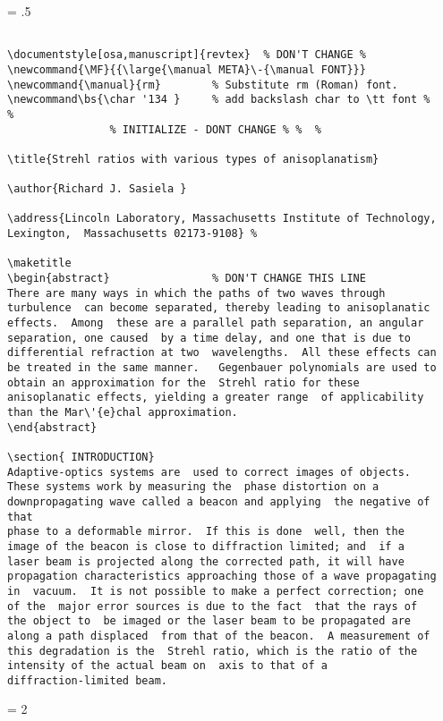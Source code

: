 \newpage
\baselineskip = .5\baselineskip  %
\begin{verbatim}

\documentstyle[osa,manuscript]{revtex}  % DON'T CHANGE %
\newcommand{\MF}{{\large{\manual META}\-{\manual FONT}}}
\newcommand{\manual}{rm}        % Substitute rm (Roman) font.
\newcommand\bs{\char '134 }     % add backslash char to \tt font %
%
                % INITIALIZE - DONT CHANGE % %  %

\title{Strehl ratios with various types of anisoplanatism}

\author{Richard J. Sasiela }

\address{Lincoln Laboratory, Massachusetts Institute of Technology,
Lexington,  Massachusetts 02173-9108} %

\maketitle
\begin{abstract}                % DON'T CHANGE THIS LINE
There are many ways in which the paths of two waves through
turbulence  can become separated, thereby leading to anisoplanatic
effects.  Among  these are a parallel path separation, an angular
separation, one caused  by a time delay, and one that is due to
differential refraction at two  wavelengths.  All these effects can
be treated in the same manner.   Gegenbauer polynomials are used to
obtain an approximation for the  Strehl ratio for these
anisoplanatic effects, yielding a greater range  of applicability
than the Mar\'{e}chal approximation.
\end{abstract}

\section{ INTRODUCTION}
Adaptive-optics systems are  used to correct images of objects.
These systems work by measuring the  phase distortion on a
downpropagating wave called a beacon and applying  the negative of that
phase to a deformable mirror.  If this is done  well, then the
image of the beacon is close to diffraction limited; and  if a
laser beam is projected along the corrected path, it will have
propagation characteristics approaching those of a wave propagating
in  vacuum.  It is not possible to make a perfect correction; one
of the  major error sources is due to the fact  that the rays of
the object to  be imaged or the laser beam to be propagated are
along a path displaced  from that of the beacon.  A measurement of
this degradation is the  Strehl ratio, which is the ratio of the
intensity of the actual beam on  axis to that of a
diffraction-limited beam.

\end{verbatim}
\newpage
\baselineskip = 2\baselineskip  %

